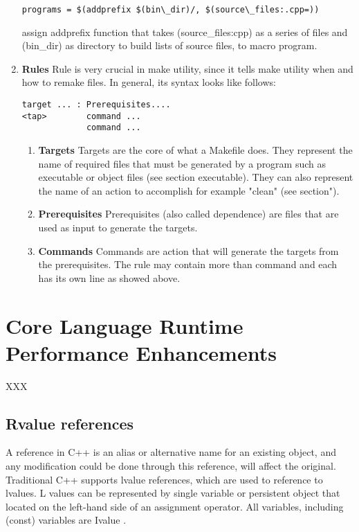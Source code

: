 \documentclass[11pt]{report}
\begin{document}
\begin{enumerate}
\begin{verbatim}
programs = $(addprefix $(bin\_dir)/, $(source\_files:.cpp=))
\end{verbatim}
assign addprefix function that takes (source\_files:cpp) as a series of files and (bin\_dir) as directory to build lists of source files, to macro program.

\item \textbf{Rules} Rule is very crucial in make utility, since it tells make utility when and how to remake files. In general, its syntax looks like follows:
\begin{verbatim}
target ... : Prerequisites....
<tap>        command ...
             command ...
\end{verbatim}

\begin{enumerate}
\item \textbf{Targets} Targets are the core of what a Makefile does. They represent the name of required files that must be generated by a program such as executable or object files (see section executable). They can also represent the name of an action to accomplish for example "clean" (see section").

\item \textbf{Prerequisites} Prerequisites (also called dependence) are files that are used as input to generate the targets.

\item \textbf{Commands} Commands are action that will generate the targets from the prerequisites. The rule may contain more than command and each has its own line as showed above.

\end{enumerate}

\end{enumerate}


\chapter{Core Language Runtime Performance Enhancements}
\label{chapter: Runtime Performance Enhancements}

XXX

\section{Rvalue references}
\label{section: Rvalue references}
A reference in C++ is an alias or alternative name for an existing object, and any modification could be done through this reference, will affect the original. Traditional C++ supports lvalue references, which are used to reference to lvalues. L values can be represented by single variable or persistent object that located on the left-hand side of an assignment operator. All variables, including (const) variables are Ivalue \cite{Gregorie:professionalcpp}.
\end{document}
